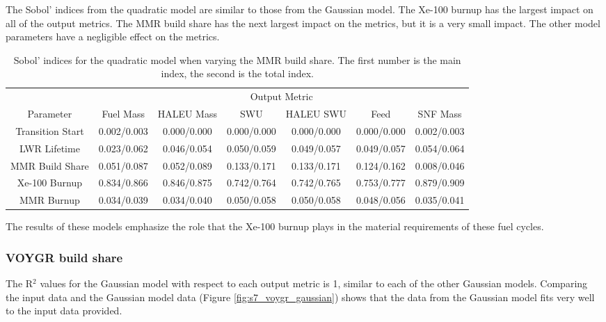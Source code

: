 The Sobol' indices from the quadratic model are similar to those from the 
Gaussian model. The Xe-100 burnup has the largest impact on all of the 
output metrics. The \gls{MMR} build share has the next largest impact 
on the metrics, but it is a very small impact. The other model 
parameters have a negligible effect on the metrics. 

\begin{table}
    \centering
    \caption{Sobol' indices for the quadratic model when varying the MMR 
    build share. The first number is the main index, the second is the total 
    index.}
    \label{tab:s7_sobol_mmr_quadratic}
    \begin{tabular}{c c c c c c c}
        \hline
        & \multicolumn{6}{c}{Output Metric} \\
        Parameter & Fuel Mass & HALEU Mass & SWU & HALEU SWU & Feed & SNF Mass \\
        \hline
        Transition Start & 0.002/0.003 & 0.000/0.000 & 0.000/0.000 &
                        0.000/0.000 & 0.000/0.000 & 0.002/0.003\\
        LWR Lifetime & 0.023/0.062 & 0.046/0.054 & 0.050/0.059 &
                       0.049/0.057 & 0.049/0.057 & 0.054/0.064\\
        MMR Build Share & 0.051/0.087 & 0.052/0.089 & 0.133/0.171 &
                          0.133/0.171 & 0.124/0.162 & 0.008/0.046\\
        Xe-100 Burnup & \cellcolor{green!25}0.834/0.866 & \cellcolor{green!25}0.846/0.875 & \cellcolor{green!25}0.742/0.764 &
        \cellcolor{green!25}0.742/0.765 & \cellcolor{green!25}0.753/0.777 & \cellcolor{green!25}0.879/0.909\\
        MMR Burnup & 0.034/0.039 & 0.034/0.040 & 0.050/0.058 & 
                     0.050/0.058 & 0.048/0.056 & 0.035/0.041\\
        \hline        
    \end{tabular}
\end{table}

The results of these models emphasize the role that the Xe-100 burnup 
plays in the material requirements of these fuel cycles. 

\subsubsection{VOYGR build share}
The R$^2$ values for the Gaussian model with respect to 
each output metric is 1, similar to each of the other Gaussian 
models. Comparing the input data and the Gaussian model data 
(Figure \ref{fig:s7_voygr_gaussian}) shows that the data from the 
Gaussian model fits very well to the input data provided. 

